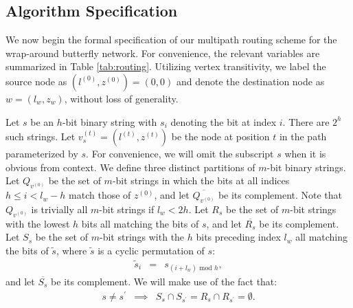 \documentclass[10pt,letterpaper]{article}
\newcommand{\beq}{\begin{eqnarray}}
\newcommand{\eeq}{\end{eqnarray}}
\providecommand{\DIFdelend}{} %
\begin{document}
\DIFdelend \subsection*{Algorithm Specification}

We now begin the formal specification of our multipath routing scheme for the
wrap-around butterfly network.
For convenience, the relevant variables are summarized in Table \ref{tab:routing}.
Utilizing vertex transitivity, we label the source node as
$(l^{(0)}, z^{(0)}) = (0, 0)$ and denote the destination node as $w = (l_w, z_w)$,
without loss of generality.

Let $s$ be an $h$-bit binary string with $s_i$ denoting the bit at index $i$.
There are $2^h$ such strings.
Let $v_s^{(t)} = (l^{(t)}, z^{(t)})$ be the node at position $t$
in the path parameterized by $s$.
For convenience,
we will omit the subscript $s$ when it is obvious from context.
We define three distinct partitions of $m$-bit binary strings.
Let $Q_{v^{(0)}}$ be the set of $m$-bit
strings in which the bits at
all indices $h \leq i < l_w - h$ match those of $z^{(0)}$,
and let $\overline{Q_{v^{(0)}}}$ be its complement.
Note that $Q_{v^{(0)}}$ is trivially all $m$-bit strings if $l_w < 2h$.
Let $R_s$ be the set of $m$-bit strings with the lowest $h$
bits all matching the bits of $s$,
and let $\overline{R_s}$ be its complement.
Let $S_s$ be the set of $m$-bit strings with the $h$ bits
preceding index $l_w$ all matching the bits of $\tilde{s}$,
where $\tilde{s}$ is a cyclic permutation of $s$:
\beq
\tilde{s}_i &=& s_{(i + l_w) \text{ mod } h},
\eeq
and let $\overline{S_s}$ be its complement.
We will make use of the fact that:
\beq
s \neq s^\prime &\implies&
S_s \cap S_{s^\prime} = R_s \cap R_{s^\prime} = \emptyset.
\eeq
\end{document}
